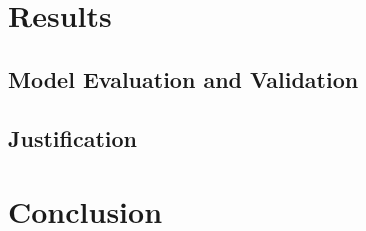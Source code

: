 \documentclass[a4paper,10pt]{article}
\begin{document}
\section{Results}

\subsection{Model Evaluation and Validation}

\subsection{Justification}

\section{Conclusion}
\end{document}
